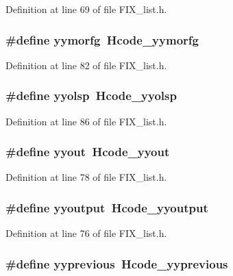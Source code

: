 Definition at line 69 of file FIX\_\-list.h.
\subsubsection{\setlength{\rightskip}{0pt plus 5cm}\#define \bf{yymorfg}~Hcode\_\-yymorfg}\label{FIX__list_8h_9cb077d9d445c80872b386d88fe8a1ea}




Definition at line 82 of file FIX\_\-list.h.
\subsubsection{\setlength{\rightskip}{0pt plus 5cm}\#define \bf{yyolsp}~Hcode\_\-yyolsp}\label{FIX__list_8h_0e690e32452c62a1a1cd8e846a1485aa}




Definition at line 86 of file FIX\_\-list.h.
\subsubsection{\setlength{\rightskip}{0pt plus 5cm}\#define \bf{yyout}~Hcode\_\-yyout}\label{FIX__list_8h_4fd44867d448dcb6fc32ea004a15de54}




Definition at line 78 of file FIX\_\-list.h.
\subsubsection{\setlength{\rightskip}{0pt plus 5cm}\#define yyoutput~Hcode\_\-yyoutput}\label{FIX__list_8h_c689806b750d25a2a7a8a8750c35677a}




Definition at line 76 of file FIX\_\-list.h.
\subsubsection{\setlength{\rightskip}{0pt plus 5cm}\#define \bf{yyprevious}~Hcode\_\-yyprevious}\label{FIX__list_8h_97d266fb812e14e5e288d6eced940adc}




